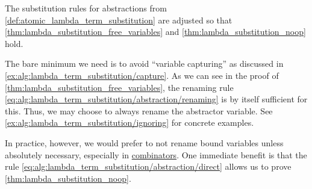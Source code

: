 \begin{remark}\label{rem:renaming_substitution_rules}
  The substitution rules for abstractions from \cref{def:atomic_lambda_term_substitution} are adjusted so that \cref{thm:lambda_substitution_free_variables} and \cref{thm:lambda_substitution_noop} hold.

  The bare minimum we need is to avoid \enquote{variable capturing} as discussed in \cref{ex:alg:lambda_term_substitution/capture}. As we can see in the proof of \cref{thm:lambda_substitution_free_variables}, the renaming rule \eqref{eq:alg:lambda_term_substitution/abstraction/renaming} is by itself sufficient for this. Thus, we may choose to always rename the abstractor variable. See \cref{ex:alg:lambda_term_substitution/ignoring} for concrete examples.

  In practice, however, we would prefer to not rename bound variables unless absolutely necessary, especially in \hyperref[def:lambda_combinator]{combinators}. One immediate benefit is that the rule \eqref{eq:alg:lambda_term_substitution/abstraction/direct} allows us to prove \cref{thm:lambda_substitution_noop}.
\end{remark}

